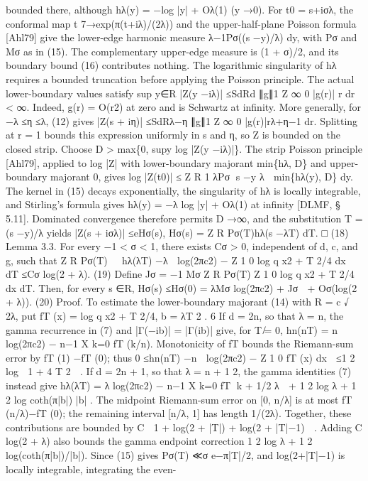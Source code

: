 bounded there, although
hλ(y) = −log |y| + Oλ(1)
(y →0).
For t0 = s+iσλ, the conformal map t 7→exp(π(t+iλ)/(2λ)) and the upper-half-plane Poisson
formula [Ahl79] give the lower-edge harmonic measure λ−1Pσ((s −y)/λ) dy, with Pσ and Mσ
as in (15). The complementary upper-edge measure is (1 + σ)/2, and its boundary bound (16)
contributes nothing.
The logarithmic singularity of hλ requires a bounded truncation before applying the Poisson
principle. The actual lower-boundary values satisfy
sup
y∈R
|Z(y −iλ)| ≤SdRd
∥g∥1
Z ∞
0
|g(r)|
r
dr < ∞.
Indeed, g(r) = O(r2) at zero and is Schwartz at inﬁnity. More generally, for −λ ≤η ≤λ, (12)
gives
|Z(s + iη)| ≤SdRλ−η
∥g∥1
Z ∞
0
|g(r)|rλ+η−1 dr.
Splitting at r = 1 bounds this expression uniformly in s and η, so Z is bounded on the closed
strip. Choose D > max\{0, supy log |Z(y −iλ)|\}. The strip Poisson principle [Ahl79], applied to
log |Z| with lower-boundary majorant min\{hλ, D\} and upper-boundary majorant 0, gives
log |Z(t0)| ≤
Z
R
1
λPσ
s −y
λ

min\{hλ(y), D\} dy.
The kernel in (15) decays exponentially, the singularity of hλ is locally integrable, and Stirling’s
formula gives hλ(y) = −λ log |y| + Oλ(1) at inﬁnity [DLMF, § 5.11]. Dominated convergence
therefore permits D →∞, and the substitution T = (s −y)/λ yields
|Z(s + iσλ)| ≤eHσ(s),
Hσ(s) =
Z
R
Pσ(T)hλ(s −λT) dT.
□
(18)
Lemma 3.3. For every −1 < σ < 1, there exists Cσ > 0, independent of d, c, and g, such that
Z
R
Pσ(T)
hλ(λT) −λ

log(2πc2) −
Z 1
0
log
q
x2 + T 2/4 dx
 dT ≤Cσ log(2 + λ).
(19)
Deﬁne
Jσ = −1
Mσ
Z
R
Pσ(T)
Z 1
0
log
q
x2 + T 2/4 dx dT.
Then, for every s ∈R,
Hσ(s) ≤Hσ(0) = λMσ
 log(2πc2) + Jσ
 + Oσ(log(2 + λ)).
(20)
Proof. To estimate the lower-boundary majorant (14) with R = c
√
2λ, put
fT (x) = log
q
x2 + T 2/4,
b = λT
2 .
6
If d = 2n, so that λ = n, the gamma recurrence in (7) and |Γ(−ib)| = |Γ(ib)| give, for T ̸= 0,
hn(nT) = n log(2πc2) −
n−1
X
k=0
fT (k/n).
Monotonicity of fT bounds the Riemann-sum error by fT (1) −fT (0); thus
0 ≤hn(nT) −n

log(2πc2) −
Z 1
0
fT (x) dx

≤1
2 log

1 + 4
T 2

.
If d = 2n + 1, so that λ = n + 1
2, the gamma identities (7) instead give
hλ(λT) = λ log(2πc2) −
n−1
X
k=0
fT
k + 1/2
λ

+ 1
2 log λ + 1
2 log coth(π|b|)
|b|
.
The midpoint Riemann-sum error on [0, n/λ] is at most fT (n/λ)−fT (0); the remaining interval
[n/λ, 1] has length 1/(2λ). Together, these contributions are bounded by
C

1 + log(2 + |T|) + log(2 + |T|−1)

.
Adding C log(2 + λ) also bounds the gamma endpoint correction 1
2 log λ + 1
2 log(coth(π|b|)/|b|).
Since (15) gives Pσ(T) ≪σ e−π|T|/2, and log(2+|T|−1) is locally integrable, integrating the even-

